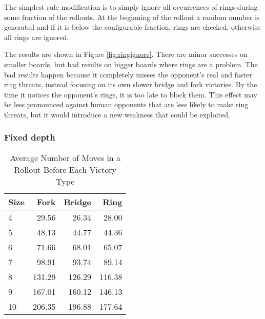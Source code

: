 The simplest rule modification is to simply ignore all occurrences of rings during some fraction of the rollouts. At the beginning of the rollout a random number is generated and if it is below the configurable fraction, rings are checked, otherwise all rings are ignored.

The results are shown in Figure \ref{fig:ringignore}. There are minor successes on smaller boards, but bad results on bigger boards where rings are a problem. The bad results happen because it completely misses the opponent's real and faster ring threats, instead focusing on its own slower bridge and fork victories. By the time it notices the opponent's rings, it is too late to block them. This effect may be less pronounced against human opponents that are less likely to make ring threats, but it would introduce a new weakness that could be exploited.



\subsubsection{Fixed depth}

\begin{table}
	\centering
	\begin{tabular}{l|rrr}
		Size & Fork   & Bridge &   Ring \\ \hline
		   4 &  29.56 &  26.34 &  28.00 \\
		   5 &  48.13 &  44.77 &  44.36 \\
		   6 &  71.66 &  68.01 &  65.07 \\
		   7 &  98.91 &  93.74 &  89.14 \\
		   8 & 131.29 & 126.29 & 116.38 \\
		   9 & 167.01 & 160.12 & 146.13 \\
		  10 & 206.35 & 196.88 & 177.64 \\
	\end{tabular}
	\caption{Average Number of Moves in a Rollout Before Each Victory Type}
	\label{tab:wintypedepth}
\end{table}

